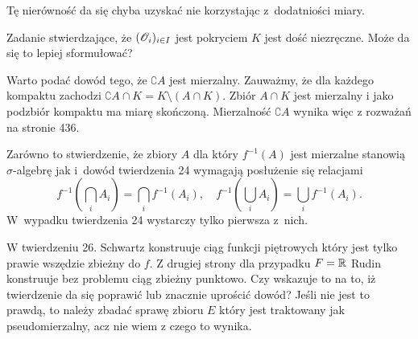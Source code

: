 \documentclass[a4paper,11pt]{article}
\numberwithin{equation}{section}
\begin{document}
\VerSpaceFour





\noindent
{} Tę nierówność da się chyba uzyskać nie korzystając z~dodatniości
miary.

\VerSpaceFour





\noindent
{} Zadanie stwierdzające, że
$( \mathcal{O}_{ i } )_{ i \in I }$ jest pokryciem $K$ jest dość niezręczne.
Może da się to lepiej sformułować?

\VerSpaceFour





\noindent
{} Warto podać dowód tego, że $\complement A$ jest
mierzalny. Zauważmy, że dla każdego kompaktu zachodzi
$\complement A \cap K = K \setminus ( A \cap K )$. Zbiór $A \cap K$
jest mierzalny i jako podzbiór kompaktu ma miarę skończoną.
Mierzalność $\complement A$ wynika więc z rozważań na stronie 436.

\VerSpaceFour





\noindent
{} Zarówno to stwierdzenie, że zbiory $A$ dla który
$f^{ -1 }( A )$ jest mierzalne stanowią $\sigma$-algebrę jak i~dowód
twierdzenia 24 wymagają posłużenie się relacjami
\begin{equation}
  \label{eq:SchwartzKAMVolI-05}
  f^{ -1 }( \bigcap_{ i } A_{ i } ) = \bigcap_{ i } f^{ -1 }( A_{ i } ), \quad
  f^{ -1 }( \bigcup_{ i } A_{ i } ) = \bigcup_{ i } f^{ -1 }( A_{ i } ).
\end{equation}
W~wypadku twierdzenia 24 wystarczy tylko pierwsza z~nich.

\VerSpaceFour





\noindent
{} W twierdzeniu 26. Schwartz konstruuje ciąg funkcji
piętrowych który jest tylko prawie wszędzie zbieżny do $f$. Z drugiej
strony dla przypadku $F = \mathbb{R}$ Rudin
\cite{RudinAnalizaRzeczywistaIZespolona1998} konstruuje bez problemu
ciąg zbieżny punktowo. Czy wskazuje to na to, iż twierdzenie da się
poprawić lub znacznie uprościć dowód? Jeśli nie jest to prawdą, to
należy zbadać sprawę zbioru $E$ który jest traktowany jak
pseudomierzalny, acz nie wiem z czego to wynika.

\VerSpaceFour
\end{document}
